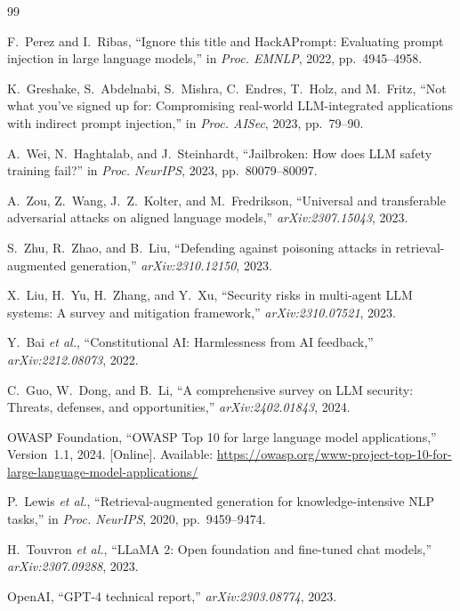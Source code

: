 \balance

\begin{thebibliography}{99}

F.~Perez and I.~Ribas, ``Ignore this title and HackAPrompt: Evaluating prompt injection in large language models,'' in \emph{Proc. EMNLP}, 2022, pp.~4945--4958.

K.~Greshake, S.~Abdelnabi, S.~Mishra, C.~Endres, T.~Holz, and M.~Fritz, ``Not what you've signed up for: Compromising real-world LLM-integrated applications with indirect prompt injection,'' in \emph{Proc. AISec}, 2023, pp.~79--90.

A.~Wei, N.~Haghtalab, and J.~Steinhardt, ``Jailbroken: How does LLM safety training fail?'' in \emph{Proc. NeurIPS}, 2023, pp.~80079--80097.

A.~Zou, Z.~Wang, J.~Z.~Kolter, and M.~Fredrikson, ``Universal and transferable adversarial attacks on aligned language models,'' \emph{arXiv:2307.15043}, 2023.

S.~Zhu, R.~Zhao, and B.~Liu, ``Defending against poisoning attacks in retrieval-augmented generation,'' \emph{arXiv:2310.12150}, 2023.

X.~Liu, H.~Yu, H.~Zhang, and Y.~Xu, ``Security risks in multi-agent LLM systems: A survey and mitigation framework,'' \emph{arXiv:2310.07521}, 2023.

Y.~Bai \emph{et al.}, ``Constitutional AI: Harmlessness from AI feedback,'' \emph{arXiv:2212.08073}, 2022.

C.~Guo, W.~Dong, and B.~Li, ``A comprehensive survey on LLM security: Threats, defenses, and opportunities,'' \emph{arXiv:2402.01843}, 2024.

{OWASP Foundation}, ``OWASP Top 10 for large language model applications,'' Version~1.1, 2024. [Online]. Available: \url{https://owasp.org/www-project-top-10-for-large-language-model-applications/}

P.~Lewis \emph{et al.}, ``Retrieval-augmented generation for knowledge-intensive NLP tasks,'' in \emph{Proc. NeurIPS}, 2020, pp.~9459--9474.

H.~Touvron \emph{et al.}, ``LLaMA 2: Open foundation and fine-tuned chat models,'' \emph{arXiv:2307.09288}, 2023.

{OpenAI}, ``GPT-4 technical report,'' \emph{arXiv:2303.08774}, 2023.


\end{thebibliography}
